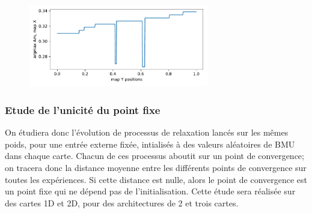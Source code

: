 \begin{figure}
\centering
\includegraphics[width=0.7\textwidth]{am_006.pdf}
\end{figure}

\subsubsection{Etude de l'unicité du point fixe}

On étudiera donc l'évolution de processus de relaxation lancés sur les mêmes poids, pour une entrée externe fixée, intialisés à des valeurs aléatoires de BMU dans chaque carte.
Chacun de ces processus aboutit sur un point de convergence; on tracera donc la distance moyenne entre les différents points de convergence sur toutes les expériences. Si cette distance est nulle, alors le point de convergence est un point fixe qui ne dépend pas de l'initialisation. 
Cette étude sera réalisée sur des cartes 1D et 2D, pour des architectures de 2 et trois cartes.

